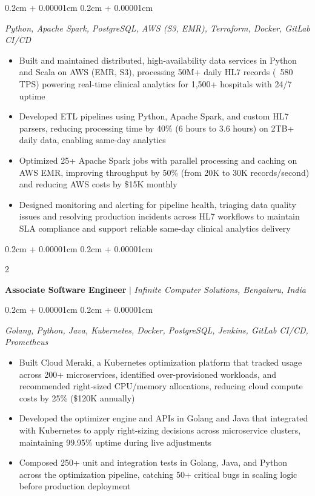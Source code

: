 \documentclass[9pt]{extarticle}
\newenvironment{highlights}{
    \begin{itemize}[
        topsep=0.02cm,
        parsep=0.02cm,
        partopsep=0pt,
        itemsep=0.01cm,
        leftmargin=0.4cm + 10pt
    ]
    \setlength{\itemsep}{0.01cm}
    \renewcommand{\labelitemi}{\textcolor{black}{$\bullet$}}
}{
    \end{itemize}
}
\newenvironment{onecolentry}{
    \begin{adjustwidth}{
        0.2cm + 0.00001cm
    }{
        0.2cm + 0.00001cm
    }
}{
    \end{adjustwidth}
}
\newenvironment{twocolentrywide}[2][]{
    \onecolentry
    \def\secondColumn{{\fontsize{8.5pt}{10pt}\selectfont #2}}
    \setcolumnwidth{\fill, 5cm}
    \begin{paracol}{2}
}{
    \switchcolumn \raggedleft \secondColumn
    \end{paracol}
    \endonecolentry
}
\begin{document}
    \begin{onecolentry}
        \textit{Python, Apache Spark, PostgreSQL, AWS (S3, EMR), Terraform, Docker, GitLab CI/CD}
        \begin{highlights}
            \item Built and maintained distributed, high-availability data services in Python and Scala on AWS (EMR, S3), processing 50M+ daily HL7 records (~580 TPS) powering real-time clinical analytics for 1,500+ hospitals with 24/7 uptime
            \item Developed ETL pipelines using Python, Apache Spark, and custom HL7 parsers, reducing processing time by 40\% (6 hours to 3.6 hours) on 2TB+ daily data, enabling same-day analytics
            \item Optimized 25+ Apache Spark jobs with parallel processing and caching on AWS EMR, improving throughput by 50\% (from 20K to 30K records/second) and reducing AWS costs by \$15K monthly
            \item Designed monitoring and alerting for pipeline health, triaging data quality issues and resolving production incidents across HL7 workflows to maintain SLA compliance and support reliable same-day clinical analytics delivery
        \end{highlights}
    \end{onecolentry}

    \vspace{0.06cm}

    \begin{twocolentrywide}{
    \textbf{August 2021 - February 2023}}
        \textbf{Associate Software Engineer} $|$ \textit{Infinite Computer Solutions, Bengaluru, India}
    \end{twocolentrywide}

    \vspace{0.05cm}

    \begin{onecolentry}
        \textit{Golang, Python, Java, Kubernetes, Docker, PostgreSQL, Jenkins, GitLab CI/CD, Prometheus}
        \begin{highlights}
            \item Built Cloud Meraki, a Kubernetes optimization platform that tracked usage across 200+ microservices, identified over-provisioned workloads, and recommended right-sized CPU/memory allocations, reducing cloud compute costs by 25\% (\$120K annually)
            \item Developed the optimizer engine and APIs in Golang and Java that integrated with Kubernetes to apply right-sizing decisions across microservice clusters, maintaining 99.95\% uptime during live adjustments
            \item Composed 250+ unit and integration tests in Golang, Java, and Python across the optimization pipeline, catching 50+ critical bugs in scaling logic before production deployment
        \end{highlights}
    \end{onecolentry}
\end{document}
